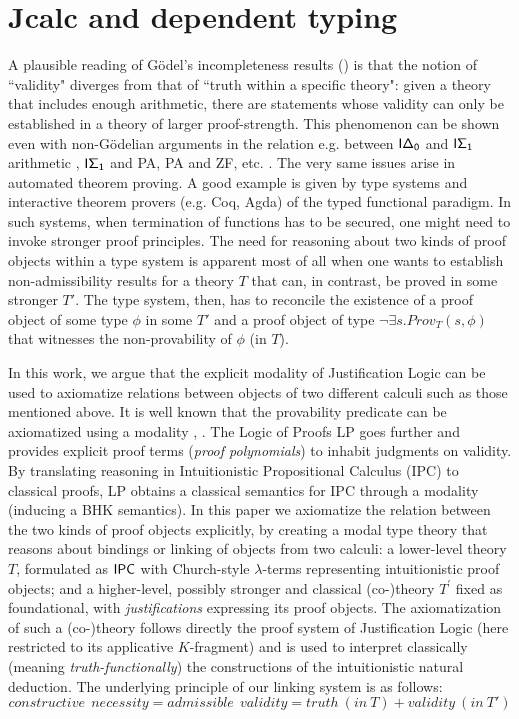 
\chapter{Jcalc and dependent typing}

A plausible reading of  G\"{o}del's incompleteness results (\cite{citeulike:713002}) 
 is that the notion of ``validity" diverges from that of ``truth within a specific theory": 
 given a theory that includes enough arithmetic, there are statements whose validity can only be 
 established in a theory of larger proof-strength.  This phenomenon can be shown even 
 with non-G\"{o}delian arguments in the relation e.g.  between ${\sf I\Delta_0}$ and ${\sf I\Sigma_1}$ 
 arithmetic \cite{parikh:existence}, ${\sf I\Sigma_1}$ and {\sf PA}, {\sf PA} and {\sf ZF},  etc. 
 \cite{Smith05anintroduction,Buss199879}. The very same issues arise in automated theorem proving. 
 A good example is given by type systems and interactive theorem provers (e.g. Coq, Agda) of the
  typed functional paradigm. In such systems, when termination of functions has to be secured, 
  one might need to invoke stronger proof principles. 
The need for reasoning about two kinds of proof objects within a type system is apparent most of
 all when one wants to establish non-admissibility results for a theory $T$ that can, 
 in contrast, be proved in some stronger $T'$. The type system, then, has to reconcile 
 the existence of  a proof object of some type $\phi$ in some $T'$  and a proof object of 
 type $\neg \exists s. Prov_{T}(s,\phi)$ that witnesses the non-provability of  $\phi$ (in $T$). 

In this work, we argue that the explicit modality of Justification Logic \cite{DBLP:conf/jelia/Artemov08} can be used to axiomatize relations between objects of two different calculi such as those mentioned above.  It is well known that the provability predicate can be axiomatized using a modality \cite{citeulike:214701}, \cite{ArtBek05HPL}. The Logic of Proofs {\sf LP} \cite{Art94APAL} goes further and provides explicit proof terms (\textit{proof polynomials}) to inhabit judgments on validity. By translating reasoning in Intuitionistic Propositional Calculus ({\sf IPC}) to classical proofs, {\sf LP} obtains a classical semantics for {\sf IPC} through a modality (inducing a {\sf BHK} semantics). In this paper we axiomatize the relation between the two kinds of proof objects explicitly, by creating a modal type theory that reasons about bindings or linking of objects from two calculi: a lower-level theory $T$, formulated as ${\sf IPC}$ with Church-style $\lambda$-terms representing intuitionistic proof objects; and a higher-level, possibly stronger and classical (co-)theory $T^\prime$ fixed as foundational, with \textit{justifications} expressing its proof objects. The axiomatization of such a (co-)theory follows directly the proof system of Justification Logic (here restricted to its applicative $K$-fragment) and is used to interpret classically (meaning \textit{truth-functionally}) the constructions of the intuitionistic natural deduction. The underlying principle of our linking system is as follows: $$constructive\ \  necessity= admissible \ \ validity = truth\  (in\  T) + validity\  (in\  T')$$ 


